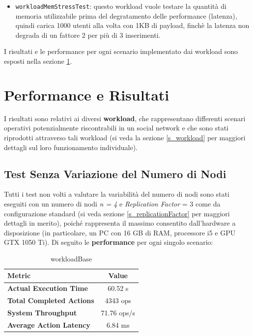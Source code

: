 \documentclass[12pt]{article}
\begin{document}
\begin{itemize}
    \item \texttt{workloadMemStressTest}: questo workload vuole testare la quantità di memoria utilizzabile prima del degratamento delle performance (latenza), quindi carica 1000 utenti alla volta con 1KB di payload, finchè la latenza non degrada di un fattore 2 per più di 3 inserimenti.
\end{itemize}

\noindent
I risultati e le performance per ogni scenario implementato dai workload sono esposti nella sezione \ref{s_risultati}.

\section{Performance e Risultati} \label{s_risultati}
I risultati sono relativi ai diversi \textbf{workload}, che rappresentano differenti scenari operativi potenzialmente riscontrabili in un social network e che sono stati riprodotti attraverso tali workload (si veda la sezione \ref{s_workload} per maggiori dettagli sul loro funzionamento individuale).

\subsection{Test Senza Variazione del Numero di Nodi} \label{s_risultati2}
Tutti i test non volti a valutare la variabilità del numero di nodi sono stati eseguiti con un numero di nodi \textit{n = 4} e \textit{Replication Factor} = 3 come da configurazione standard (si veda sezione \ref{s_replicationFactor} per maggiori dettagli in merito), poiché rappresenta il massimo consentito dall’hardware a disposizione (in particolare, un PC con 16 GB di RAM, processore i5 e GPU GTX 1050 Ti).
\newline\newline
\noindent
Di seguito le \textbf{performance} per ogni singolo scenario:

\begin{table}[H]
\centering
\begin{tabular}{|l|c|}
\hline
\textbf{Metric} & \textbf{Value} \\
\hline
\textbf{Actual Execution Time} & 60.52 s \\
\hline
\textbf{Total Completed Actions} & 4343 ops \\
\hline
\textbf{System Throughput} & 71.76 ops/s \\
\hline
\textbf{Average Action Latency} & 6.84 ms \\
\hline
\end{tabular}
\caption{workloadBase}
\label{t_base}
\end{table}
\end{document}
